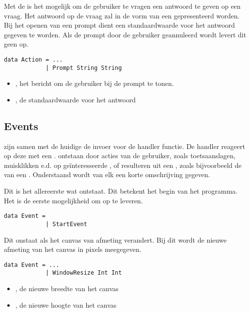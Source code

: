 Met de  is het mogelijk om de gebruiker te vragen een antwoord te geven op een vraag. Het antwoord op de vraag zal in de vorm van een  gepresenteerd worden. Bij het openen van een prompt dient een standaardwaarde voor het antwoord gegeven te worden. Als de prompt door de gebruiker geannuleerd wordt levert dit geen  op.
\begin{lstlisting}
data Action = ...
			| Prompt String String
\end{lstlisting}
\begin{itemize}
	\item {}, het bericht om de gebruiker bij de prompt te tonen. 
	\item {}, de standaardwaarde voor het antwoord
\end{itemize}

\subsection{Events}
\events zijn samen met de huidige  de invoer voor de handler functie. De handler reageert op deze \events met een . \events ontstaan door acties van de gebruiker, zoals toetsaanslagen, muisklikken e.d. op geïnteresseerde \shapes, of resulteren uit een , zoals bijvoorbeeld de  van een .
Onderstaand wordt van elk  een korte omschrijving gegeven.

Dit is het allereerste  wat ontstaat. Dit  betekent het begin van het programma. Het is de eerste mogelijkheid om  op te leveren.
\begin{lstlisting}
data Event = 
			| StartEvent
\end{lstlisting}

Dit  onstaat als het canvas van afmeting verandert. Bij dit  wordt de nieuwe afmeting van het canvas in pixels meegegeven.
\begin{lstlisting}
data Event = ...
			| WindowResize Int Int
\end{lstlisting}
\begin{itemize}
	\item {}, de nieuwe breedte van het canvas
	\item {}, de nieuwe hoogte van het canvas
\end{itemize}


